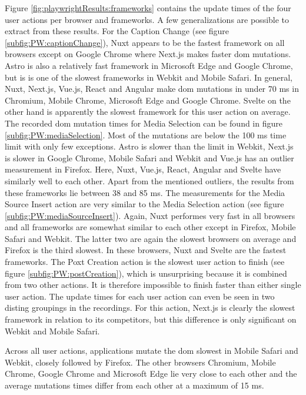 \documentclass[a4paper, 12pt]{article}
\begin{document}
Figure \ref{fig:playwrightResults:frameworks} contains the update times of the four user actions per browser and frameworks.
A few generalizations are possible to extract from these results.
For the Caption Change (see figure \ref{subfig:PW:captionChange}), Nuxt appears to be the fastest framework on all browsers except on Google Chrome where Next.js makes faster \acrshort{dom} mutations.
Astro is also a relatively fast framework in Microsoft Edge and Google Chrome, but is is one of the slowest frameworks in Webkit and Mobile Safari.
In general, Nuxt, Next.js, Vue.js, React and Angular make \acrshort{dom} mutations in under 70 ms in Chromium, Mobile Chrome, Microsoft Edge and Google Chrome.
Svelte on the other hand is apparently the slowest framework for this user action on average.
The recorded \acrshort{dom} mutation times for Media Selection can be found in figure \ref{subfig:PW:mediaSelection}.
Most of the mutations are below the 100 ms time limit with only few exceptions.
Astro is slower than the limit in Webkit, Next.js is slower in Google Chrome, Mobile Safari and Webkit and Vue.js has an outlier measurement in Firefox.
Here, Nuxt, Vue.js, React, Angular and Svelte have similarly well to each other.
Apart from the mentioned outliers, the results from these frameworks lie between 38 and 85 ms.
The measurements for the Media Source Insert action are very similar to the Media Selection action (see figure \ref{subfig:PW:mediaSourceInsert}).
Again, Nuxt performes very fast in all browsers and all frameworks are somewhat similar to each other except in Firefox, Mobile Safari and Webkit.
The latter two are again the slowest browsers on average and Firefox is the third slowest.
In these browsers, Nuxt and Svelte are the fastest frameworks.
The Poxt Creation action is the slowest user action to finish (see figure \ref{subfig:PW:postCreation}), which is unsurprising because it is combined from two other actions.
It is therefore impossible to finish faster than either single user action.
The update times for each user action can even be seen in two disting groupings in the recordings.
For this action, Next.js is clearly the slowest framework in relation to its competitors, but this difference is only significant on Webkit and Mobile Safari.

Across all user actions, applications mutate the \acrshort{dom} slowest in Mobile Safari and Webkit, closely followed by Firefox.
The other browsers Chromium, Mobile Chrome, Google Chrome and Microsoft Edge lie very close to each other and the average mutations times differ from each other at a maximum of 15 ms.
\end{document}
